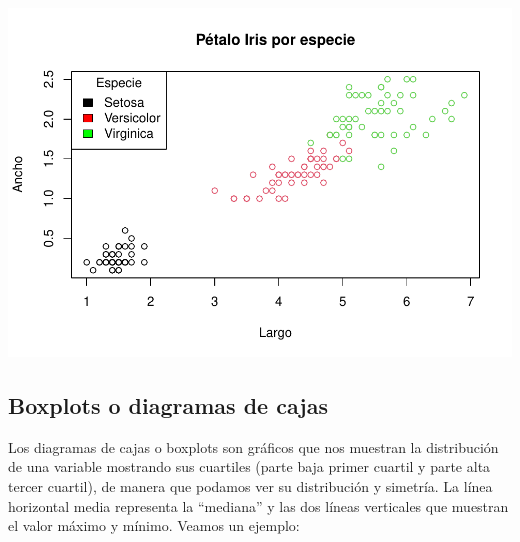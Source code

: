\documentclass[
]{book}
\newenvironment{Shaded}{\begin{snugshade}}{\end{snugshade}}
\newcommand{\AttributeTok}[1]{\textcolor[rgb]{0.13,0.29,0.53}{#1}}
\newcommand{\FunctionTok}[1]{\textcolor[rgb]{0.13,0.29,0.53}{\textbf{#1}}}
\newcommand{\NormalTok}[1]{#1}
\newcommand{\SpecialCharTok}[1]{\textcolor[rgb]{0.81,0.36,0.00}{\textbf{#1}}}
\newcommand{\StringTok}[1]{\textcolor[rgb]{0.31,0.60,0.02}{#1}}
\begin{document}
\begin{Shaded}
\end{Shaded}

\includegraphics{_main_files/figure-latex/unnamed-chunk-193-1.pdf}

\newpage

\subsection{Boxplots o diagramas de cajas}\label{boxplots-o-diagramas-de-cajas}

Los diagramas de cajas o boxplots son gráficos que nos muestran la distribución de una variable mostrando sus cuartiles (parte baja primer cuartil y parte alta tercer cuartil), de manera que podamos ver su distribución y simetría.
La línea horizontal media representa la ``mediana'' y las dos líneas verticales que muestran el valor máximo y mínimo.
Veamos un ejemplo:\\
\end{document}

